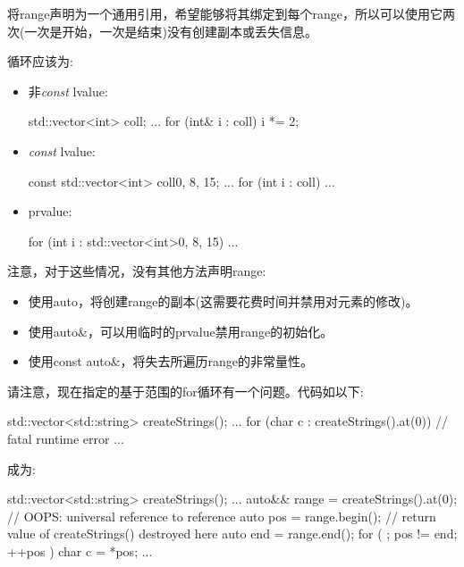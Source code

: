 将range声明为一个通用引用，希望能够将其绑定到每个range，所以可以使用它两次(一次是开始，一次是结束)没有创建副本或丢失信息。\par

循环应该为:\par

\begin{itemize}
  \item 非\textit{const} lvalue:
\begin{codebox}[cpp]
  std::vector<int> coll;
  ...
  for (int& i : coll) {
    i *= 2;
  }
\end{codebox}
  \item \textit{const} lvalue:
\begin{codebox}[cpp]
  const std::vector<int> coll{0, 8, 15};
  ...
  for (int i : coll) {
    ...
  }
\end{codebox}
  \item prvalue:
\begin{codebox}[cpp]
  for (int i : std::vector<int>{0, 8, 15}) {
    ...
  }
\end{codebox}
\end{itemize}

注意，对于这些情况，没有其他方法声明range:\par

\begin{itemize}
  \item 使用auto，将创建range的副本(这需要花费时间并禁用对元素的修改)。
  \item 使用auto\&，可以用临时的prvalue禁用range的初始化。
  \item 使用const auto\&，将失去所遍历range的非常量性。
\end{itemize}

请注意，现在指定的基于范围的for循环有一个问题。代码如以下:\par

\begin{codebox}[cpp]
  std::vector<std::string> createStrings();
  ...
  for (char c : createStrings().at(0)) { // fatal runtime error
    ...
  }
\end{codebox}

成为:\par

\begin{codebox}[cpp]
  std::vector<std::string> createStrings();
  ...
  auto&& range = createStrings().at(0); // OOPS: universal reference to reference
  auto pos = range.begin(); // return value of createStrings() destroyed here
  auto end = range.end();
  for ( ; pos != end; ++pos ) {
    char c = *pos;
    ...
  }
\end{codebox}

